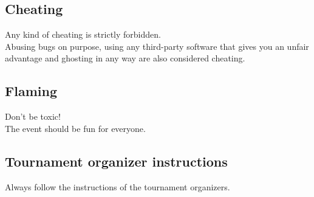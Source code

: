 \documentclass{article}
\begin{document}
\subsection{Cheating}
Any kind of cheating is strictly forbidden.\\
Abusing bugs on purpose, using any third-party software that gives you an unfair advantage and ghosting in any way are also considered cheating.

\subsection{Flaming}
Don't be toxic!\\
The event should be fun for everyone.


\subsection{Tournament organizer instructions}
Always follow the instructions of the tournament organizers.
\end{document}
